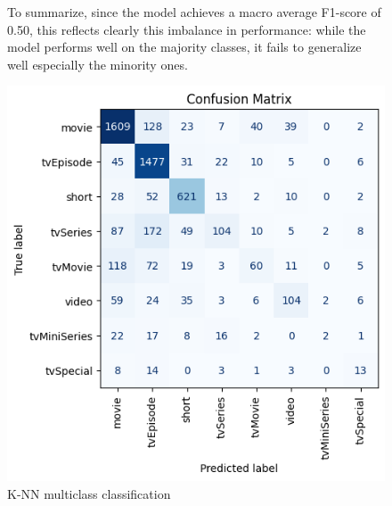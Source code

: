 \begin{figure}[H]
\begin{minipage}[t]{0.59\textwidth}
        To summarize, since the model achieves a macro average F1-score of 0.50, this reflects clearly this imbalance in performance: while the model performs well on the majority classes, it fails to generalize well especially the minority ones.
    \end{minipage}
    \hfill
    \begin{minipage}[t]{0.40\textwidth}
        \vspace{0pt}
        \centering
        \includegraphics[width=\linewidth]{plots/knn_multiclass_confmatrix.png}
        \captionsetup{justification=centering, width=0.65\linewidth}
        \caption{K-NN multiclass classification}
        \label{fig:multiclass_knn_confusion_matrix}
    \end{minipage}
\end{figure}
\vspace{-0.8em}

